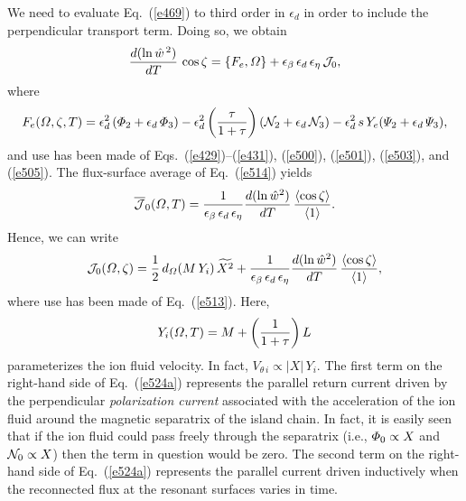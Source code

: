 \documentclass[12pt,prb,aps]{revtex4-1}
\begin{document}
We need to evaluate Eq.~(\ref{e469}) to third order in $\epsilon_d$ in order to include the perpendicular transport term. Doing so,
we obtain
\begin{equation}\label{e514}
\frac{d(\ln \hat{w}^{\,2})}{dT}\,\cos\zeta = \{F_e, {\mit\Omega}\} + \epsilon_\beta\,\epsilon_d\,\epsilon_\eta\,{\cal J}_0,
\end{equation}
where
\begin{equation}
F_e({\mit\Omega},\zeta,T)= \epsilon_d^2\,({\mit\Phi}_2+\epsilon_d\,{\mit\Phi}_3)-\epsilon_d^{2}\left(\frac{\tau}{1+\tau}\right)({\cal N}_2+\epsilon_d\,{\cal N}_3)
- \epsilon_d^2\,s\,Y_e({\mit\Psi}_2+\epsilon_d\,{\mit\Psi}_3),
\end{equation}
and use has been made of Eqs.~(\ref{e429})--(\ref{e431}), (\ref{e500}), (\ref{e501}), (\ref{e503}), and (\ref{e505}). 
The flux-surface average of Eq.~(\ref{e514}) yields
\begin{equation}
\overline{\cal J}_0({\mit\Omega},T) = \frac{1}{\epsilon_\beta\,\epsilon_d\,\epsilon_\eta}\frac{d(\ln \hat{w}^{2})}{dT}\,\frac{\langle\cos\zeta\rangle}{\langle 1\rangle}.
\end{equation}
 Hence, we
can write
\begin{equation}\label{e524a}
{\cal J}_0({\mit\Omega},\zeta)= 
\frac{1}{2}\,d_{\mit\Omega}\!\left(M\,Y_i\right)\widetilde{X^2}+ \frac{1}{\epsilon_\beta\,\epsilon_d\,\epsilon_\eta}\frac{d(\ln \hat{w}^{2})}{dT}\,\frac{\langle\cos\zeta\rangle}{\langle 1\rangle},
\end{equation}
where use has been made of Eq.~(\ref{e513}). Here, 
\begin{equation}\label{yi}
Y_i({\mit\Omega},T)= M + \left(\frac{1}{1+\tau}\right)L
\end{equation} 
parameterizes the ion fluid velocity. In fact, $V_{\theta\,i}\propto |X|\,Y_i$. 
The first term on the right-hand side of Eq.~(\ref{e524a}) represents the parallel return current driven by the perpendicular {\em polarization current}\/ associated with the
acceleration of the ion fluid around the magnetic separatrix of the island chain.\cite{smol1,smol2} 
In fact, it is easily seen that if the ion fluid could pass freely through the separatrix (i.e., ${\mit\Phi}_0\propto X$ and ${\cal N}_0\propto X$) then the term in question would be zero. The second term on the right-hand side of Eq.~(\ref{e524a}) represents the parallel current driven
inductively when the reconnected flux at the resonant surfaces varies in time. 
\end{document}
